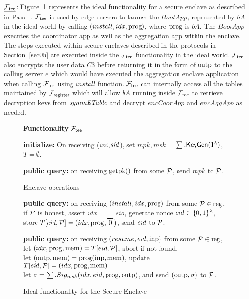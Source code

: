 $\underline{\mathcal{F}_{\mathsf{tee}}}$: Figure~\ref{fig:ftee} represents the ideal functionality for a secure enclave as described in Pass \kETAL~\cite{pass2017formal}. $\mathcal{F}_{\mathsf{tee}}$ is used by edge servers to launch the $BootApp$, represented by $bA$ in the ideal world by calling $(install,idx,\mathrm{prog})$, where $\mathrm{prog}$ is $bA$. The $BootApp$ executes the coordinator app as well as the aggregation app within the enclave. The steps executed within secure enclaves described in the protocols in Section~\ref{sec05} are executed inside the $\mathcal{F}_{\mathsf{tee}}$ functionality in the ideal world. %
$\mathcal{F}_{\mathsf{tee}}$ also encrypts the user data $C3$ before returning it in the form of $\mathrm{outp}$ to the calling server $e$ which would have executed the aggregation enclave application when calling $\mathcal{F}_{\mathsf{tee}}$ using $install$ function. $\mathcal{F}_{\mathsf{tee}}$ can internally access all the tables maintained by $\mathcal{F}_{\mathsf{register}}$ which will allow $bA$ running inside $\mathcal{F}_{\mathsf{tee}}$ to retrieve decryption keys from $\mathit{symmETable}$ and decrypt $encCoorApp$ and $encAggApp$ as needed.  






\begin{figure}[h]
\begin{mdframed}
\begin{center}
\textbf{Functionality} $\mathcal{F}_{\mathsf{tee}}$
\end{center}


\textbf{initialize:}
On receiving ($ini$,$\mathit{sid}$), set $mpk,msk$ = $\sum.\mathsf{KeyGen}(1^{\lambda})$, $T = \emptyset$. %

\textbf{public query:}
on receiving $\mathrm{getpk}()$ from some $\mathcal{P}$, send $mpk$ to $\mathcal{P}$.
\vspace{0.1in}
\begin{mdframed}
\begin{center}
Enclave operations
\end{center}

\textbf{public query:} on receiving $(install,idx,\mathrm{prog})$ from some $\mathcal{P} \in \mathrm{reg}$, if $\mathcal{P}$ is honest, assert $idx == sid$, generate nonce $eid \in \{ 0,1 \}^{\lambda}$, store $T[ eid,\mathcal{P}] = (idx, \mathrm{prog},\overrightarrow{0})$, send $eid$ to $\mathcal{P}$.

\textbf{public query:} on receiving $(resume, eid, \mathrm{inp})$ from some $\mathcal{P} \in \mathrm{reg}$,\\
let $(idx, \mathrm{prog}, \mathrm{mem}) = T[eid,\mathcal{P}]$, abort if not found.\\
let $(\mathrm{outp},\mathrm{mem}) = \mathrm{prog}(\mathrm{inp},\mathrm{mem})$, update $T[eid,\mathcal{P}] = (idx,\mathrm{prog},\mathrm{mem})$\\
let $\sigma = \sum.Sig_{msk}(idx, eid, \mathrm{prog}, \mathrm{outp})$, and send $(\mathrm{outp}, \sigma)$ to $\mathcal{P}$.
\end{mdframed}


\end{mdframed}
\caption{Ideal functionality for the Secure Enclave~\cite{pass2017formal}}
\label{fig:ftee}
\end{figure}



